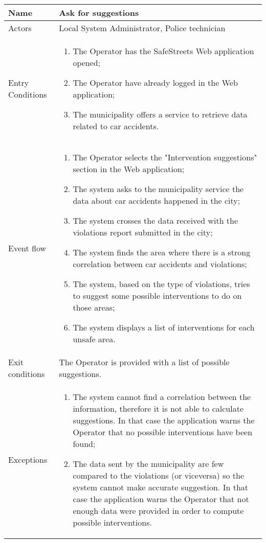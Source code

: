 \begin{table}[H]
  \centering
  \renewcommand{\arraystretch}{0.6}
  \begin{tabularx}{\textwidth}{ |l|X| }
    \hline
    Name & Ask for suggestions \\
    \hline
    Actors & Local System Administrator, Police technician\\
    \hline
    Entry Conditions & \begin{enumerate}[noitemsep]
                        \item The Operator has the SafeStreets Web application opened;
                        \item The Operator have already logged in the Web application;
                        \item The municipality offers a service to retrieve data related to car accidents.
                      \end{enumerate}\\
    \hline
    Event flow & \begin{enumerate}[noitemsep]
                    \item The Operator selects the "Intervention suggestions" section in the Web application;
                    \item The system asks to the municipality service the data about car accidents happened in the city;
                    \item The system crosses the data received with the violations report submitted in the city;
                    \item The system finds the area where there is a strong correlation between car accidents and violations;
                    \item The system, based on the type of violations, tries to suggest some possible interventions to do on those areas;
                    \item The system displays a list of interventions for each unsafe area.
                    \end{enumerate}\\
    \hline
    Exit conditions & The Operator is provided with a list of possible suggestions.\\ 
    \hline
    Exceptions &  \begin{enumerate}
                    \item The system cannot find a correlation between the information, therefore it is not able to calculate suggestions. In that case the application warns the Operator that no possible interventions have been found;
                    \item The data sent by the municipality are few compared to the violations (or viceversa) so the system cannot make accurate suggestion. In that case the application warns the Operator that not enough data were provided in order to compute possible interventions.
                  \end{enumerate} \\
    \hline
  \end{tabularx}
\end{table}
